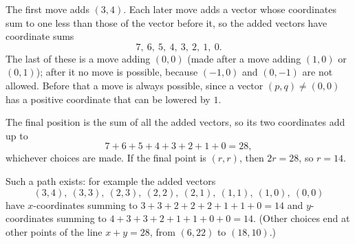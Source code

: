 The first move adds $(3,4)$. Each later move adds a vector whose coordinates sum to one less than those of the vector before it, so the added vectors have coordinate sums
\[7,\ 6,\ 5,\ 4,\ 3,\ 2,\ 1,\ 0 .\]
The last of these is a move adding $(0,0)$ (made after a move adding $(1,0)$ or $(0,1)$); after it no move is possible, because $(-1,0)$ and $(0,-1)$ are not allowed. Before that a move is always possible, since a vector $(p,q)\ne(0,0)$ has a positive coordinate that can be lowered by $1$.

The final position is the sum of all the added vectors, so its two coordinates add up to
\[7+6+5+4+3+2+1+0=28,\]
whichever choices are made. If the final point is $(r,r)$, then $2r=28$, so $r=\boxed{14}$.

Such a path exists: for example the added vectors
\[(3,4),\ (3,3),\ (2,3),\ (2,2),\ (2,1),\ (1,1),\ (1,0),\ (0,0)\]
have $x$-coordinates summing to $3+3+2+2+2+1+1+0=14$ and $y$-coordinates summing to $4+3+3+2+1+1+0+0=14$. (Other choices end at other points of the line $x+y=28$, from $(6,22)$ to $(18,10)$.)
